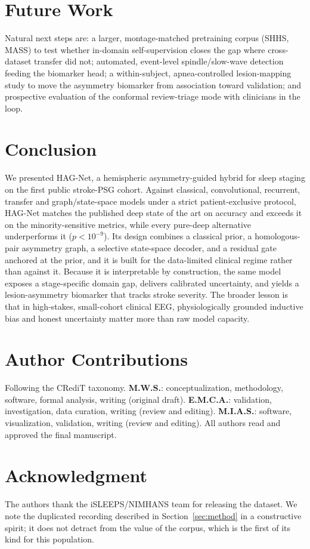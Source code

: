 \documentclass[journal]{IEEEtran}
\begin{document}
\section{Future Work}
Natural next steps are: a larger, montage-matched pretraining corpus (SHHS, MASS) to
test whether in-domain self-supervision closes the gap where cross-dataset transfer
did not; automated, event-level spindle/slow-wave detection feeding the biomarker
head; a within-subject, apnea-controlled lesion-mapping study to move the asymmetry
biomarker from association toward validation; and prospective evaluation of the
conformal review-triage mode with clinicians in the loop.

\section{Conclusion}
We presented HAG-Net, a hemispheric asymmetry-guided hybrid for sleep staging on the
first public stroke-PSG cohort. Against classical, convolutional, recurrent,
transfer and graph/state-space models under a strict patient-exclusive protocol,
HAG-Net matches the published deep state of the art on accuracy and exceeds it on
the minority-sensitive metrics, while every pure-deep alternative underperforms it
($p<10^{-9}$). Its design combines a classical prior, a homologous-pair asymmetry
graph, a selective state-space decoder, and a residual gate anchored at the
prior, and it is built for the data-limited clinical regime rather than against
it. Because it is interpretable by construction, the same model exposes a
stage-specific domain gap, delivers calibrated uncertainty, and yields a
lesion-asymmetry biomarker that tracks stroke severity. The broader lesson is that
in high-stakes, small-cohort clinical EEG, physiologically grounded inductive bias
and honest uncertainty matter more than raw model capacity.

\section*{Author Contributions}
Following the CRediT taxonomy. \textbf{M.W.S.}: conceptualization, methodology,
software, formal analysis, writing (original draft). \textbf{E.M.C.A.}: validation,
investigation, data curation, writing (review and editing). \textbf{M.I.A.S.}:
software, visualization, validation, writing (review and editing). All authors read
and approved the final manuscript.

\section*{Acknowledgment}
The authors thank the iSLEEPS/NIMHANS team for releasing the dataset. We note the
duplicated recording described in Section~\ref{sec:method} in a constructive spirit;
it does not detract from the value of the corpus, which is the first of its kind for
this population.



\end{document}
